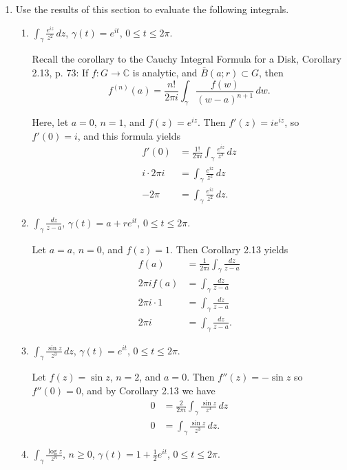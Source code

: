 \documentclass[11pt,oneside,english]{amsart}
\theoremstyle{definition}
\newcommand{\MB}[1]{\mathbb{#1}}
\begin{document}
\begin{enumerate}[leftmargin=*]
\item Use the results of this section to evaluate the following integrals.

\begin{enumerate}
\itemsep5mm
\item $\displaystyle \int_\gamma \frac{e^{iz}}{z^2}\,dz$, $\gamma(t)=e^{it}$, $0\leq t\leq 2\pi$.

Recall the corollary to the Cauchy Integral Formula for a Disk, Corollary 2.13, p. 73: If $f:G\to \MB{C}$ is analytic, and $\bar B(a;r)\subset G$, then
\[
f^{(n)}(a)=\frac{n!}{2\pi i}\int_\gamma \frac{f(w)}{(w-a)^{n+1}}\,dw.
\]

Here, let $a=0$, $n=1$, and $f(z)=e^{iz}$. Then $f'(z)=ie^{iz}$, so $f'(0)=i$, and this formula yields
\begin{align*}
f'(0)&=\frac{1!}{2\pi i}\int_\gamma \frac{e^{iz}}{z^2}\,dz\\[2mm]
i\cdot 2\pi i &=\int_\gamma \frac{e^{iz}}{z^2}\,dz\\[2mm]
-2\pi &= \int_\gamma \frac{e^{iz}}{z^2}\,dz.
\end{align*}

\item $\displaystyle \int_\gamma \frac{dz}{z-a}$, $\gamma(t)=a+re^{it}$, $0\leq t\leq 2\pi$.

Let $a=a$, $n=0$, and $f(z)=1$. Then Corollary 2.13 yields
\begin{align*}
f(a)&=\frac{1}{2\pi i}\int_\gamma \frac{dz}{z-a}\\[2mm]
2\pi i f(a) &=\int_\gamma \frac{dz}{z-a}\\[2mm]
2\pi i \cdot 1 &=\int_\gamma \frac{dz}{z-a}\\[2mm]
2\pi i &=\int_\gamma \frac{dz}{z-a}.
\end{align*}

\item $\displaystyle \int_\gamma \frac{\sin z}{z^3}\,dz$, $\gamma(t)=e^{it}$, $0\leq t\leq 2\pi$. 

Let $f(z)=\sin z$, $n=2$, and $a=0$. Then $f''(z)=-\sin z$ so $f''(0)=0$, and by Corollary 2.13 we have
\begin{align*}
0&=\frac{2}{2\pi i}\int_\gamma \frac{\sin z}{z^3}\,dz\\[2mm]
0&=\int_\gamma \frac{\sin z}{z^3}\,dz.
\end{align*}

\item $\displaystyle \int_\gamma \frac{\log z}{z^n}$, $n\geq 0$, $\gamma(t)=1+\frac{1}{2}e^{it}$, $0\leq t\leq 2\pi$.


\end{enumerate}
\end{enumerate}
\end{document}
